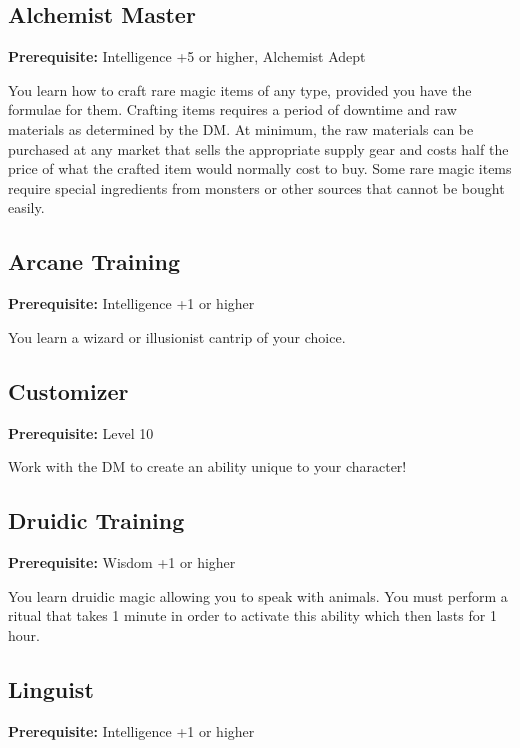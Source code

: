 \documentclass[12pt,letterpaper,twocolumn,openany,nodeprecatedcode,bg=none]{dndbook}
\let\oldsubsection\subsection
\renewcommand{\subsection}[1]{%
  \needspace{5\baselineskip}%
  \oldsubsection{#1}%
}
\begin{document}
\subsection{Alchemist Master}\label{alchemist-master}

\textbf{Prerequisite:} Intelligence +5 or higher, Alchemist Adept

You learn how to craft rare magic items of any type, provided you have
the formulae for them. Crafting items requires a period of downtime and
raw materials as determined by the DM. At minimum, the raw materials can
be purchased at any market that sells the appropriate supply gear and
costs half the price of what the crafted item would normally cost to
buy. Some rare magic items require special ingredients from monsters or
other sources that cannot be bought easily.

\subsection{Arcane Training}\label{arcane-training}

\textbf{Prerequisite:} Intelligence +1 or higher

You learn a wizard or illusionist cantrip of your choice.

\subsection{Customizer}\label{customizer}

\textbf{Prerequisite:} Level 10

Work with the DM to create an ability unique to your character!

\subsection{Druidic Training}\label{druidic-training}

\textbf{Prerequisite:} Wisdom +1 or higher

You learn druidic magic allowing you to speak with animals. You must
perform a ritual that takes 1 minute in order to activate this ability
which then lasts for 1 hour.

\subsection{Linguist}\label{linguist}

\textbf{Prerequisite:} Intelligence +1 or higher
\end{document}
